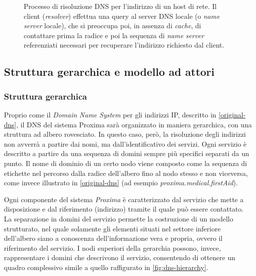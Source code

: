 \documentclass[a4paper,12pt]{report}
\begin{document}
\begin{description}
\begin{figure}[H]
		\caption{Processo di risoluzione DNS per l'indirizzo di un host di rete. Il client (\emph{resolver}) effettua una query al server DNS locale (o \emph{name server} locale), che si preoccupa poi, in assenza di \emph{cache}, di contattare prima la radice e poi la sequenza di \emph{name server} referenziati necessari per recuperare l'indirizzo richiesto dal client.}
		\label{fig:dns-resolution}
	\end{figure}
\end{description}

\subsection{Struttura gerarchica e modello ad attori} 
\subsubsection{Struttura gerarchica}\label{dns-hierarchy}
Proprio come il \emph{Domain Name System} per gli indirizzi IP, descritto in \autoref{original-dns}, il DNS del sistema Proxima sarà organizzato in maniera gerarchica, con una struttura ad albero rovesciato. In questo caso, però, la risoluzione degli indirizzi non avverrà a partire dai nomi, ma dall'identificativo dei servizi. Ogni servizio è descritto a partire da una sequenza di domini sempre più specifici separati da un punto. Il nome di dominio di un certo nodo viene composto come la sequenza di etichette nel percorso dalla radice dell'albero fino al nodo stesso e non viceversa, come invece illustrato in \autoref{original-dns} (ad esempio \emph{proxima.medical.firstAid}). 

Ogni componente del sistema \emph{Proxima} è caratterizzato dal servizio che mette a disposizione e dal riferimento (indirizzo) tramite il quale può essere contattato. La separazione in domini del servizio permette la costruzione di un modello strutturato, nel quale solamente gli elementi situati nel settore inferiore dell'albero siano a conoscenza dell'informazione vera e propria, ovvero il riferimento del servizio. I nodi superiori della gerarchia possono, invece, rappresentare i domini che descrivono il servizio, consentendo di ottenere un quadro complessivo simile a quello raffigurato in \autoref{fig:dns-hierarchy}.
\end{document}
